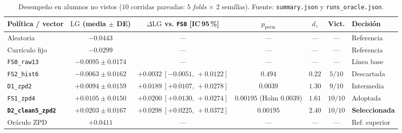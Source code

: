 \documentclass[10.5pt,a4paper]{article}
\newcommand{\code}[1]{\texttt{\color{InkDark}#1}}
\begin{document}
\begin{table}[H]
  \centering
  \caption{Desempeño en alumnos no vistos ($10$ corridas pareadas: $5$ \textit{folds} $\times$ $2$ semillas). Fuente: \code{summary.json} y \code{runs\_oracle.json}.}
  \footnotesize
  \setlength{\tabcolsep}{4pt}
  \begin{tabularx}{\textwidth}{l c c c c c >{\raggedright\arraybackslash}X}
    \toprule
    \rowcolor{ElectricBlue}
    \textbf{\color{white}Política / vector} &
    \textbf{\color{white}$\mathrm{LG}$ (media $\pm$ DE)} &
    \textbf{\color{white}$\Delta\mathrm{LG}$ vs. \texttt{FS0} [IC\,95\,\%]} &
    \textbf{\color{white}$p_{\text{perm}}$} &
    \textbf{\color{white}$d_z$} &
    \textbf{\color{white}Vict.} &
    \textbf{\color{white}Decisión} \\
    \midrule
    Aleatoria & $-0.0443$ & --- & --- & --- & --- & Referencia \\
    \rowcolor{RowTintBlue} Currículo fijo & $-0.0299$ & --- & --- & --- & --- & Referencia \\
    \code{FS0\_raw13} & $-0.0095 \pm 0.0174$ & --- & --- & --- & --- & Línea base \\
    \rowcolor{RowTintBlue} \code{FS2\_hist6} & $-0.0063 \pm 0.0162$ & $+0.0032\ [-0.0051,\, +0.0122]$ & $0.494$ & $0.22$ & $5/10$ & Descartada \\
    \code{D1\_zpd2} & $+0.0094 \pm 0.0159$ & $+0.0189\ [+0.0107,\, +0.0278]$ & $0.0039$ & $1.30$ & $9/10$ & Intermedia \\
    \rowcolor{RowTintBlue} \code{FS1\_zpd4} & $+0.0105 \pm 0.0150$ & $+0.0200\ [+0.0130,\, +0.0274]$ & $0.00195$ {\scriptsize(Holm $0.0039$)} & $1.61$ & $10/10$ & Adoptada \\
    \rowcolor{RowTintRose}
    \textbf{\color{VividMagenta}\texttt{D2\_clean5\_zpd2}} &
    \textbf{\color{VividMagenta}$+0.0203 \pm 0.0167$} &
    \textbf{\color{VividMagenta}$+0.0298\ [+0.0225,\, +0.0372]$} &
    \textbf{\color{VividMagenta}$0.00195$} &
    \textbf{\color{VividMagenta}$2.40$} &
    \textbf{\color{VividMagenta}$10/10$} &
    \textbf{\color{VividMagenta}Seleccionada} \\
    Oráculo ZPD & $+0.0411$ & --- & --- & --- & --- & Ref. superior \\
    \bottomrule
  \end{tabularx}
\end{table}
\end{document}
